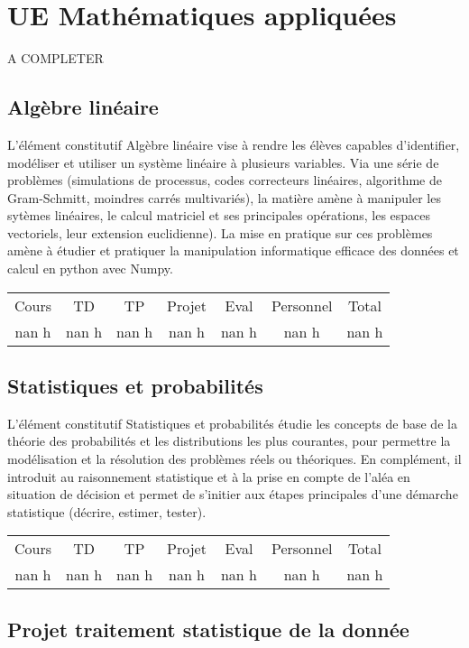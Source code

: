 \section{UE Mathématiques appliquées}%
\label{sec:UEMathmatiquesappliques}%
A COMPLETER%
\subsection{Algèbre linéaire}%
\label{subsec:Algbrelinaire}%

%
L'élément constitutif Algèbre linéaire vise à rendre les élèves capables d'identifier, modéliser et  utiliser un système linéaire à plusieurs variables. Via une série de problèmes (simulations de processus, codes correcteurs linéaires, algorithme de Gram{-}Schmitt, moindres carrés multivariés), la matière amène à manipuler les sytèmes linéaires, le calcul matriciel et ses principales opérations, les espaces vectoriels, leur extension euclidienne). La mise en pratique sur ces problèmes amène à étudier et pratiquer la manipulation informatique efficace des données et calcul en python avec Numpy.%
\begin{longtable}{c c c c c c c}%
\hline%
Cours&TD&TP&Projet&Eval&Personnel&Total\\%
nan h&nan h&nan h&nan h&nan h&nan h&nan h\\%
\hline%
\end{longtable}%
\subsection{Statistiques et probabilités}%
\label{subsec:Statistiquesetprobabilits}%

%
L'élément constitutif Statistiques et probabilités étudie les concepts de base de la théorie des probabilités et les distributions les plus courantes, pour permettre la modélisation et la résolution des problèmes réels ou théoriques. En complément, il introduit au raisonnement statistique et à la prise en compte de l'aléa en situation de décision et permet de s’initier aux étapes principales d'une démarche statistique (décrire, estimer, tester).%
\begin{longtable}{c c c c c c c}%
\hline%
Cours&TD&TP&Projet&Eval&Personnel&Total\\%
nan h&nan h&nan h&nan h&nan h&nan h&nan h\\%
\hline%
\end{longtable}%
\subsection{Projet traitement statistique de la donnée}%
\label{subsec:Projettraitementstatistiquedeladonne}%

